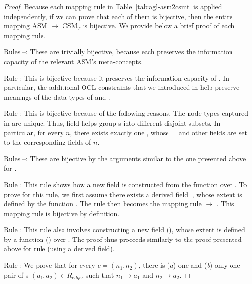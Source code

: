 \begin{proof}
Because each mapping rule in Table~\ref{tab:agl-asm2csmt} is applied independently, if we can prove that each of them is bijective, then the entire mapping ASM $\rightarrow$ CSM$_T$ is bijective. We provide below a brief proof of each mapping rule.

Rules --: These are trivially bijective, because each preserves the information capacity of the relevant ASM's meta-concepts.

Rule : This is bijective because it preserves the information capacity of . In particular, the additional OCL constraints that we introduced in  help preserve meanings of the data types of  and .

Rule : This is bijective because of the following reasons. The node types captured in  are unique. Thus, field  helps group s into different disjoint subsets. In particular, for every  $n$, there exists exactly one , whose  =  and other fields are set to the corresponding fields of $n$. 

Rules --: These are bijective by the arguments similar to the one presented above for .

Rule : This rule shows how a new field  is constructed from the function  over . To prove for this rule, we first assume there exists a derived field, , whose extent is defined by the function . The rule  then becomes the mapping rule  $ \rightarrow $ . This mapping rule is bijective by definition.

Rule : This rule also involves constructing a new field (), whose extent is defined by a function () over . The proof thus proceeds similarly to the proof presented above for rule  (\ie using a derived field).

Rule : We prove that for every  $ e = (n_1, n_2) $, there is (\textit{a}) one and (\textit{b}) only one pair of s $ (a_1, a_2) \in R_{edge} $, such that $ n_1 \rightarrow a_1$ and $ n_2 \rightarrow a_2 $.


\end{proof}
